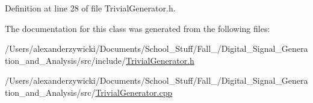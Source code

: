 Definition at line 28 of file Trivial\+Generator.\+h.



The documentation for this class was generated from the following files\+:\begin{DoxyCompactItemize}
\item 
/\+Users/alexanderzywicki/\+Documents/\+School\+\_\+\+Stuff/\+Fall\+\_/\+Digital\+\_\+\+Signal\+\_\+\+Generation\+\_\+and\+\_\+\+Analysis/src/include/\hyperlink{TrivialGenerator_8h}{Trivial\+Generator.\+h}\item 
/\+Users/alexanderzywicki/\+Documents/\+School\+\_\+\+Stuff/\+Fall\+\_/\+Digital\+\_\+\+Signal\+\_\+\+Generation\+\_\+and\+\_\+\+Analysis/src/\hyperlink{TrivialGenerator_8cpp}{Trivial\+Generator.\+cpp}\end{DoxyCompactItemize}
